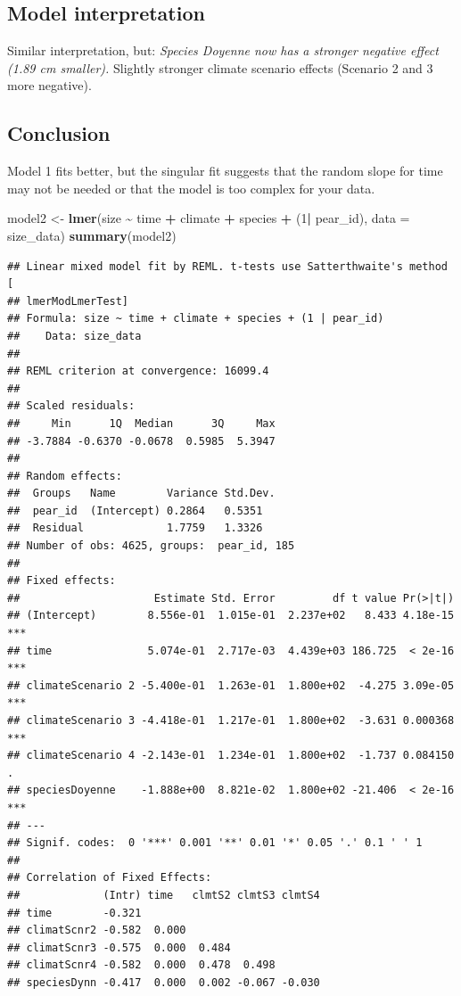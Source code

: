 \documentclass[
]{article}
\newenvironment{Shaded}{\begin{snugshade}}{\end{snugshade}}
\newcommand{\AttributeTok}[1]{\textcolor[rgb]{0.13,0.29,0.53}{#1}}
\newcommand{\DecValTok}[1]{\textcolor[rgb]{0.00,0.00,0.81}{#1}}
\newcommand{\FunctionTok}[1]{\textcolor[rgb]{0.13,0.29,0.53}{\textbf{#1}}}
\newcommand{\NormalTok}[1]{#1}
\newcommand{\OtherTok}[1]{\textcolor[rgb]{0.56,0.35,0.01}{#1}}
\newcommand{\SpecialCharTok}[1]{\textcolor[rgb]{0.81,0.36,0.00}{\textbf{#1}}}
\begin{document}
\subsection{Model interpretation}\label{model-interpretation}

Similar interpretation, but: \emph{Species Doyenne now has a stronger
negative effect (1.89 cm smaller). }Slightly stronger climate scenario
effects (Scenario 2 and 3 more negative).

\subsection{Conclusion}\label{conclusion}

Model 1 fits better, but the singular fit suggests that the random slope
for time may not be needed or that the model is too complex for your
data.

\begin{Shaded}
\begin{Highlighting}[]
\NormalTok{model2 }\OtherTok{\textless{}{-}} \FunctionTok{lmer}\NormalTok{(size }\SpecialCharTok{\textasciitilde{}}\NormalTok{ time }\SpecialCharTok{+}\NormalTok{ climate }\SpecialCharTok{+}\NormalTok{ species }\SpecialCharTok{+}\NormalTok{ (}\DecValTok{1}\SpecialCharTok{|}\NormalTok{ pear\_id), }\AttributeTok{data =}\NormalTok{ size\_data)}
\FunctionTok{summary}\NormalTok{(model2)}
\end{Highlighting}
\end{Shaded}

\begin{verbatim}
## Linear mixed model fit by REML. t-tests use Satterthwaite's method [
## lmerModLmerTest]
## Formula: size ~ time + climate + species + (1 | pear_id)
##    Data: size_data
## 
## REML criterion at convergence: 16099.4
## 
## Scaled residuals: 
##     Min      1Q  Median      3Q     Max 
## -3.7884 -0.6370 -0.0678  0.5985  5.3947 
## 
## Random effects:
##  Groups   Name        Variance Std.Dev.
##  pear_id  (Intercept) 0.2864   0.5351  
##  Residual             1.7759   1.3326  
## Number of obs: 4625, groups:  pear_id, 185
## 
## Fixed effects:
##                     Estimate Std. Error         df t value Pr(>|t|)    
## (Intercept)        8.556e-01  1.015e-01  2.237e+02   8.433 4.18e-15 ***
## time               5.074e-01  2.717e-03  4.439e+03 186.725  < 2e-16 ***
## climateScenario 2 -5.400e-01  1.263e-01  1.800e+02  -4.275 3.09e-05 ***
## climateScenario 3 -4.418e-01  1.217e-01  1.800e+02  -3.631 0.000368 ***
## climateScenario 4 -2.143e-01  1.234e-01  1.800e+02  -1.737 0.084150 .  
## speciesDoyenne    -1.888e+00  8.821e-02  1.800e+02 -21.406  < 2e-16 ***
## ---
## Signif. codes:  0 '***' 0.001 '**' 0.01 '*' 0.05 '.' 0.1 ' ' 1
## 
## Correlation of Fixed Effects:
##             (Intr) time   clmtS2 clmtS3 clmtS4
## time        -0.321                            
## climatScnr2 -0.582  0.000                     
## climatScnr3 -0.575  0.000  0.484              
## climatScnr4 -0.582  0.000  0.478  0.498       
## speciesDynn -0.417  0.000  0.002 -0.067 -0.030
\end{verbatim}
\end{document}

